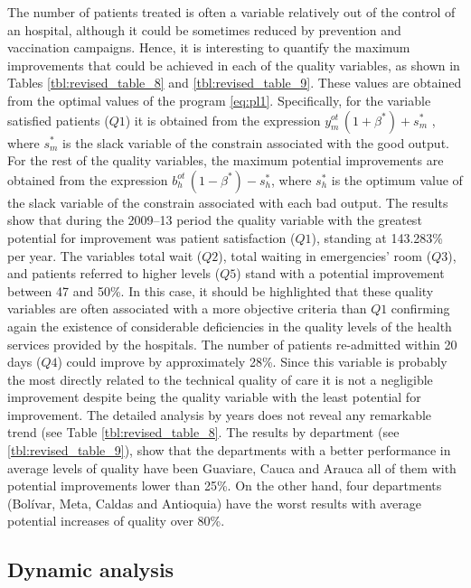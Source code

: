 \documentclass[11pt,a4paper,oneside]{article}
\begin{document}
The number of patients treated is often a variable relatively out of the control of an hospital, although it could be sometimes reduced by prevention and vaccination campaigns. Hence, it is interesting to quantify the maximum improvements that could be achieved in each of the quality variables, as shown in Tables \ref{tbl:revised_table_8} and \ref{tbl:revised_table_9}. These values are obtained from the optimal values of the program \ref{eq:pl1}. Specifically, for the variable satisfied patients ($Q1$) it is obtained from the expression $y_{m}^{ot} \, \left( 1+\beta^{*}\right)+ s_{m}^{*}$ , where $s_{m}^{*}$ is the slack variable of the constrain associated with the good output. For the rest of the quality variables, the maximum potential improvements are obtained from the expression $b_{h}^{ot} \, \left( 1-\beta^{*}\right)- s_{h}^{*}$, where $s_{h}^{*}$ is the optimum value of the slack variable of the constrain associated with each bad output. The results show that during the 2009--13 period the quality variable with the greatest potential for improvement was patient satisfaction ($Q1$), standing at 143.283\% per year. The variables total wait ($Q2$), total waiting in emergencies' room ($Q3$), and patients referred to higher levels ($Q5$) stand with a potential improvement between 47 and 50\%. In this case, it should be highlighted that these quality variables are often associated with a more objective criteria than $Q1$ confirming again the existence of considerable deficiencies in the quality levels of the health services provided by the hospitals. The number of patients re-admitted within 20 days ($Q4$) could improve by approximately 28\%. Since this variable is probably the most directly related to the technical quality of care it is not a negligible improvement despite being the quality variable with the least potential for improvement. The detailed analysis by years does not reveal any remarkable trend (see Table \ref{tbl:revised_table_8}. The results by department (see \ref{tbl:revised_table_9}), show that the departments with a better performance in average levels of quality have been Guaviare, Cauca and Arauca all of them with potential improvements lower than 25\%. On the other hand, four departments (Bol\'ivar, Meta, Caldas and Antioquia) have the worst results with average potential increases of quality over 80\%.

\color{black}


\subsection{Dynamic analysis}
\label{sec:dynamic_analysis}
\end{document}
